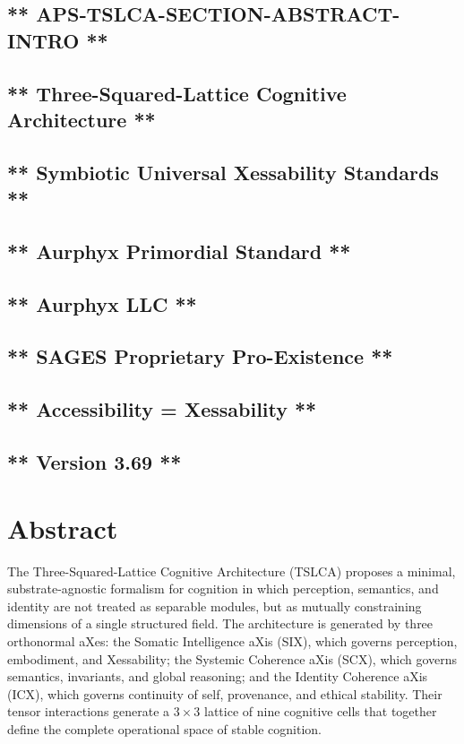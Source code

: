\subsection{** APS‑TSLCA-SECTION-ABSTRACT-INTRO **}\label{apstslca-section-abstract-intro}

\subsection{** Three-Squared-Lattice Cognitive Architecture **}\label{three-squared-lattice-cognitive-architecture}

\subsection{** Symbiotic Universal Xessability Standards **}\label{symbiotic-universal-xessability-standards}

\subsection{** Aurphyx Primordial Standard **}\label{aurphyx-primordial-standard}

\subsection{** Aurphyx LLC **}\label{aurphyx-llc}

\subsection{** SAGES \textbar{} Proprietary \textbar{} Pro-Existence **}\label{sages-proprietary-pro-existence}

\subsection{** Accessibility = Xessability **}\label{accessibility-xessability}

\subsection{** Version 3.69 **}\label{version-3.69}

\section{Abstract}\label{abstract}

The Three-Squared-Lattice Cognitive Architecture (TSLCA) proposes a minimal, substrate-agnostic formalism for cognition in which perception, semantics, and identity are not treated as separable modules, but as mutually constraining dimensions of a single structured field. The architecture is generated by three orthonormal aXes: the Somatic Intelligence aXis (SIX), which governs perception, embodiment, and Xessability; the Systemic Coherence aXis (SCX), which governs semantics, invariants, and global reasoning; and the Identity Coherence aXis (ICX), which governs continuity of self, provenance, and ethical stability. Their tensor interactions generate a \(3 \times 3\) lattice of nine cognitive cells that together define the complete operational space of stable cognition.

